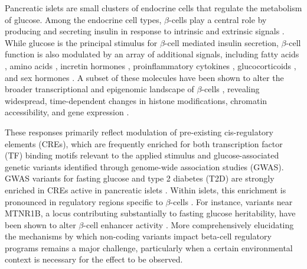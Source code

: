 Pancreatic islets are small clusters of endocrine cells that regulate the metabolism of glucose. Among the endocrine cell types, $\beta$-cells play a central role by producing and secreting insulin in response to intrinsic and extrinsic signals \cite{Prentki2013-vx}. While glucose is the principal stimulus for $\beta$-cell mediated insulin secretion, $\beta$-cell function is also modulated by an array of additional signals, including fatty acids \cite{Fu2013-cf,Mauvais-Jarvis2016-gm,Ramos-Rodriguez2019-ha,Aylward2021-nw}, amino acids \cite{Newsholme2007-xy}, incretin hormones \cite{Saxena2010-ui}, proinflammatory cytokines \cite{Benaglio2022-rq}, glucocorticoids \cite{Aylward2021-nw,Reddy2009-qu}, and sex hormones \cite{Mauvais-Jarvis2016-gm}. A subset of these molecules have been shown to alter the broader transcriptional and epigenomic landscape of $\beta$-cells \cite{Aylward2021-nw,Benaglio2022-rq,Ramos-Rodriguez2019-ha}, revealing widespread, time-dependent changes in histone modifications, chromatin accessibility, and gene expression \cite{Ramos-Rodriguez2019-ha,Benaglio2022-rq}. 

These responses primarily reflect modulation of pre-existing cis-regulatory elements (CREs), which are frequently enriched for both transcription factor (TF) binding motifs relevant to the applied stimulus and glucose-associated genetic variants identified through genome-wide association studies (GWAS). GWAS variants for fasting glucose \cite{Ingelsson2010-tw,Manning2012-ro,Scott2012-hq,Wood2017-uc,Williamson2023-gf} and type 2 diabetes (T2D) \cite{Mahajan2022-hu} are strongly enriched in CREs active in pancreatic islets \cite{Liu2016-on,Pasquali2014-cu}. Within islets, this enrichment is pronounced in regulatory regions specific to $\beta$-cells \cite{Chiou2021-ro}. For instance, variants near MTNR1B, a locus contributing substantially to fasting glucose heritability, have been shown to alter $\beta$-cell enhancer activity \cite{Prokopenko2009-ou}. More comprehensively elucidating the mechanisms by which non-coding variants impact beta-cell regulatory programs remains a major challenge, particularly when a certain environmental context is necessary for the effect to be observed.



